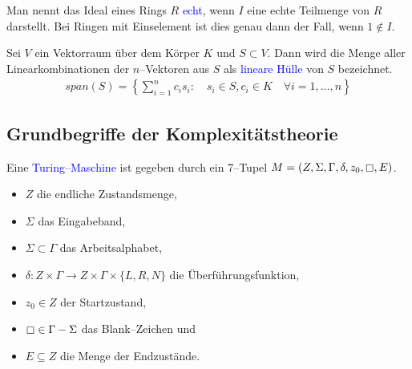 \begin{definition}
Man nennt das Ideal eines Rings $R$ \textcolor{blue}{echt}, wenn $I$ eine echte Teilmenge von $R$ darstellt. Bei Ringen mit Einselement ist dies genau dann der Fall, wenn $1 \notin I$.  \cite{Karpfinger}
\end{definition}


\begin{definition}
Sei $V$ ein Vektorraum über dem Körper $K$ und $S \subset V$. Dann wird die Menge aller Linearkombinationen der $n$--Vektoren aus $S$ als \textcolor{blue}{lineare Hülle} von $S$ bezeichnet. \cite{Howard}
\begin{align*}
span(S) = \left\{\sum_{i=1}^n c_is_i: \quad s_i \in S, c_i \in K \quad \forall i = 1,\ldots,n\right\}
\end{align*}
\end{definition}

\subsection{Grundbegriffe der Komplexitätstheorie}

\begin{definition}
Eine \textcolor{blue}{Turing--Maschine} ist gegeben durch ein 7--Tupel $M =(Z,\Sigma,\Gamma,\delta,z_0,\boxempty,E)$. \cite{Kompl1}
\begin{itemize}
\item $Z$ die endliche Zustandsmenge,
\item $\Sigma$ das Eingabeband,
\item $\Sigma \subset \Gamma$ das Arbeitsalphabet,
\item $\delta: Z \times \Gamma \rightarrow Z \times \Gamma \times \{L,R,N\}$ die Überführungsfunktion,
\item $z_0 \in Z$ der Startzustand,
\item $\boxempty \in \Gamma - \Sigma$ das Blank--Zeichen und 
\item $E \subseteq Z$ die Menge der Endzustände.
\end{itemize}
\end{definition}

